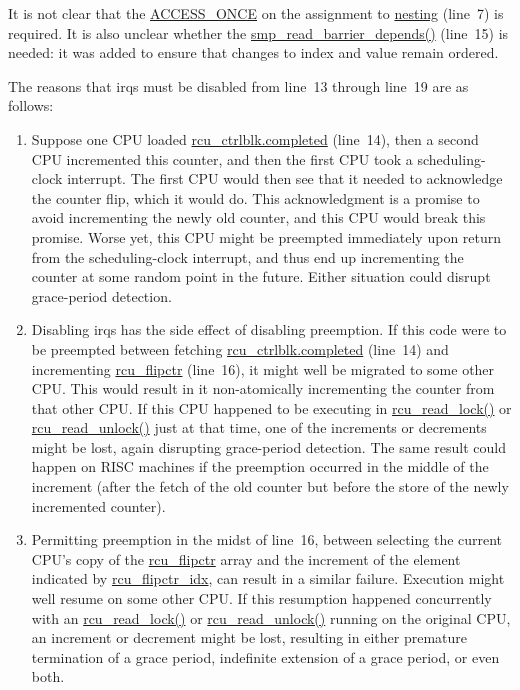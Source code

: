 It is not clear that the \url{ACCESS_ONCE} on the assignment to
\url{nesting} (line~7) is required.
It is also unclear whether the \url{smp_read_barrier_depends()}
(line~15) is needed: it was added to ensure that changes to index
and value remain ordered.

The reasons that irqs must be disabled from line~13 through
line~19 are as follows:

\begin{enumerate}
\item	Suppose one CPU loaded \url{rcu_ctrlblk.completed}
	(line~14), then a second CPU incremented this counter,
	and then the first CPU took a scheduling-clock interrupt.
	The first CPU would then see that it needed to acknowledge
	the counter flip, which it would do.
	This acknowledgment is a promise to avoid incrementing
	the newly old counter, and this CPU would break this
	promise.
	Worse yet, this CPU might be preempted immediately upon
	return from the scheduling-clock interrupt, and thus
	end up incrementing the counter at some random point
	in the future.
	Either situation could disrupt grace-period detection.

\item	Disabling irqs has the side effect of disabling preemption.
	If this code were to be preempted between fetching
	\url{rcu_ctrlblk.completed} (line~14) and
	incrementing \url{rcu_flipctr} (line~16),
	it might well be migrated to some other CPU.
	This would result in it non-atomically incrementing
	the counter from that other CPU.
	If this CPU happened to be executing in \url{rcu_read_lock()}
	or \url{rcu_read_unlock()} just at that time, one
	of the increments or decrements might be lost, again
	disrupting grace-period detection.
	The same result could happen on RISC machines if the preemption
	occurred in the middle of the increment (after the fetch of
	the old counter but before the store of the newly incremented
	counter).

\item	Permitting preemption in the midst
	of line~16, between selecting the current CPU's copy
	of the \url{rcu_flipctr} array and the increment of
	the element indicated by \url{rcu_flipctr_idx}, can
	result in a similar failure.
	Execution might well resume on some other CPU.
	If this resumption happened concurrently with an
	\url{rcu_read_lock()} or \url{rcu_read_unlock()}
	running on the original CPU,
	an increment or decrement might be lost, resulting in either
	premature termination of a grace period, indefinite extension
	of a grace period, or even both.


\end{enumerate}
